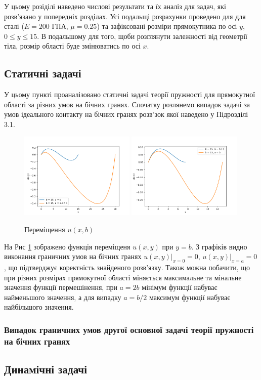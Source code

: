 У цьому розіділі наведено числові результати та їх аналіз для задач,
які розв'язано у попередніх розділах.
Усі подальщі розрахунки проведено для для сталі ($E=200$ ГПА, $\mu=0.25$) та зафіксовані розміри прямокутника по осі $y$, $0 \le y \le 15$.
В подальшому для того, щоби розглянути залежності від геометрії тіла,
розмір області буде змінюватись по осі $x$.

\subsection{Статичні задачі}

У цьому пункті проаналізовано статичні задачі теорії пружності для прямокутної області за різних умов на бічних гранях.
Спочатку розлянемо випадок задачі за умов ідеального контакту на бічних гранях
розв'зок якої наведено у Підрозділі 3.1.
\begin{figure}[h!]
    \begin{center}
        \includegraphics[width=0.49\textwidth, scale=1]{images/results/static_1/u(x,b)1.png}
        \includegraphics[width=0.49\textwidth, scale=1]{images/results/static_1/u(x,b)2.png}
        \caption{Переміщення $u(x, b)$}\label{static_1_u(x,b)1}
    \end{center}
\end{figure}

На Рис \ref{static_1_u(x,b)1} зображено функція переміщеня $u(x, y)$ при $y=b$.
З графіків видно виконання граничних умов на бічних гранях $u(x,y) |_{x=0} = 0$, $u(x,y) |_{x=a} = 0$,
що підтверджує коректність знайденого розв'язку.
Також можна побачити, що при різних розмірах прямокутної області міняється максимальне та мінальне значення функції пермешінення,
при $a = 2b$ мінімум функції набуває найменьшого значення, а для випадку $a = b / 2$ максимум функції набуває найбільшого значення.


\subsubsection{Випадок граничних умов другої основної задачі теорії пружності на бічних гранях}



\subsection{Динамічні задачі}